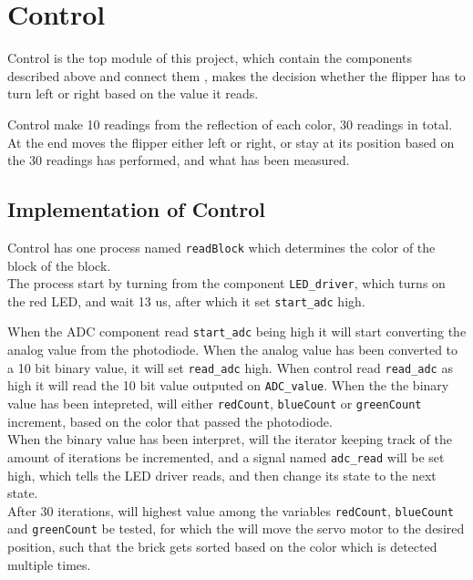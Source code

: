 \section{Control}
Control is the top module of this project, which contain the components described above and connect them , makes the decision whether the flipper has to turn left or right based on the value it reads.

Control make 10 readings from the reflection of each color,  30 readings in total. At the end moves the flipper either left or right, or stay at its position based on the 30 readings has performed, and what has been measured. 

\subsection{Implementation of Control}


Control has  one process named \texttt{readBlock} which determines the color of the block of the block. \\



The process start by turning from the component \texttt{LED\_driver}, which turns on the red LED, and wait 13 us, after which it set \texttt{start\_adc} high.

When the ADC component read \texttt{start\_adc} being high it will start converting the analog value from the photodiode.  When the analog value has been converted to a 10 bit binary value, it will set \texttt{read\_adc} high. When control read \texttt{read\_adc} as high it will read the 10 bit value outputed on \texttt{ADC\_value}. When the the binary value has been intepreted, will either \texttt{redCount}, \texttt{blueCount} or \texttt{greenCount} increment, based on the color that passed the photodiode.  \\


When the binary value has been interpret, will the iterator keeping track of the amount of iterations be incremented,  and a signal named \texttt{adc\_read} will be set high, which tells the LED driver reads, and then change its state to the next state.\\


After 30 iterations,  will highest value among the variables \texttt{redCount}, \texttt{blueCount} and \texttt{greenCount} be tested, for which the will move the servo motor to the desired position, such that the brick gets sorted based on the color which is detected multiple times. 


